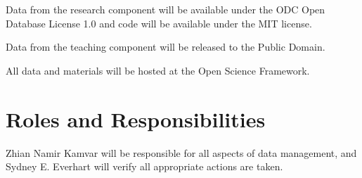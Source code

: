 \documentclass[12pt,letterpaper]{article}
\begin{document}
Data from the research component will be available under the ODC Open Database License 1.0 and code will be available under the MIT license. 

Data from the teaching component will be released to the Public Domain.

All data and materials will be hosted at the Open Science Framework.

\section{Roles and Responsibilities}

Zhian Namir Kamvar will be responsible for all aspects of data management, and Sydney E. Everhart will verify all appropriate actions are taken. 



\end{document}
